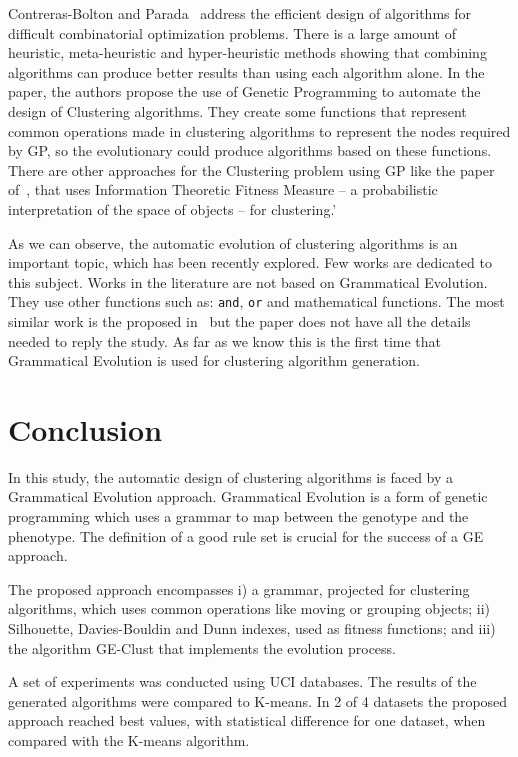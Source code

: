 \documentclass[conference]{IEEEtran}
\begin{document}
	Contreras-Bolton and Parada~\cite{bolton2015optimizing} address the efficient design of algorithms for difficult combinatorial optimization problems. There is a large amount of heuristic, meta-heuristic and hyper-heuristic methods showing that combining algorithms can produce better results than using each algorithm alone. In the paper, the authors propose the use of Genetic Programming to automate the design of Clustering algorithms. They create some functions that represent common operations made in clustering algorithms to represent the nodes required by GP, so the evolutionary could produce algorithms based on these functions. There are other approaches for the Clustering problem using GP like the paper of~\cite{boric2007genetic}, that uses Information Theoretic Fitness Measure -- a probabilistic interpretation of the space of objects -- for clustering.'
	
	As we can observe, the automatic evolution of clustering algorithms is an important topic, which has been recently explored. Few works are dedicated to this subject. Works in the literature are not based on Grammatical Evolution. They use other functions such as: \texttt{and}, \texttt{or} and mathematical functions. The most similar work is the proposed in~\cite{bolton2015optimizing} but the paper does not have all the details needed to reply the study.  As far as we know this is the first time that Grammatical Evolution is used for clustering algorithm generation. 
	
	
	\section{Conclusion}
	\label{sec:conclusion}
	
	
	In this study, the automatic design of clustering algorithms is faced by a Grammatical Evolution approach. Grammatical Evolution is a form of genetic programming which uses a grammar to map between the genotype and the phenotype. The definition of a good rule set is crucial for the success of a GE approach. 
	
	The proposed approach encompasses i) a grammar,  projected for clustering algorithms, which uses common operations like moving or grouping objects; ii)  Silhouette, Davies-Bouldin and Dunn indexes, used as fitness functions; and iii) the algorithm GE-Clust that implements the evolution process. 
	
	A set of experiments was conducted using UCI databases. The results of the generated algorithms were compared to K-means. In 2 of 4 datasets the proposed approach reached best values, with statistical difference for one dataset, when compared with the K-means algorithm.
	
\end{document}
